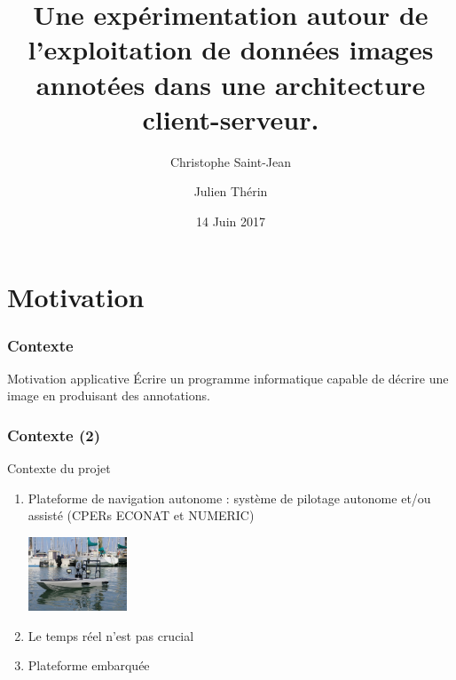 \documentclass[11pt]{beamer}
\title[]{Une expérimentation autour de l'exploitation de données images annotées dans une architecture client-serveur.}%
\author{\Large{Christophe Saint-Jean} \and \Large{Julien Thérin}}
\date{14 Juin 2017}
\begin{document}


\presentationTitle

\section*{Motivation}
\begin{frame}
\frametitle{Contexte}
\begin{block}{Motivation applicative}
\'Ecrire un programme informatique capable de décrire une image en produisant des annotations.
\end{block}
\begin{center}
\end{center}
\end{frame}
\transblindshorizontal
\begin{frame}
\frametitle{Contexte (2)}
\begin{block}{Contexte du projet}
\begin{enumerate}
\item Plateforme de navigation autonome : système de pilotage autonome
et/ou assisté (CPERs ECONAT et  NUMERIC)
\begin{center}
\includegraphics[keepaspectratio=true,height=22mm]{images/bateau_drone.jpg}
\end{center}
\pause
\item Le temps réel n'est pas crucial
\item Plateforme embarquée
\end{enumerate}
\end{block}
\end{frame}
\end{document}
